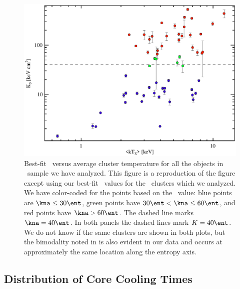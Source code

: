 \begin{figure}[htp]
  \begin{center}
    \begin{minipage}[htp]{\linewidth}
      \includegraphics*[width=\textwidth, trim=0mm 0mm 0mm 0mm, clip]{hifl_txk0}
      \caption[Best-fit \kna\ versus average cluster temperature for
        the \hifl\ sample.]{Best-fit \kna\ versus average cluster
        temperature for all the objects in \hifl\ sample we have
        analyzed. This figure is a reproduction of the
        \cite{2007hvcg.conf...42H} figure except using our best-fit
        \kna\ values for the \hifl\ clusters which we analyzed. We
        have color-coded for the points based on the \kna\ value: blue
        points are $\kna \le 30 \ent$, green points have $30 \ent <
        \kna \le 60 \ent$, and red points have $\kna > 60 \ent$. The
        dashed line marks $\kna = 40 \ent$. In both panels the dashed
        lines mark $K = 40 \ent$. We do not know if the same clusters
        are shown in both plots, but the bimodality noted in
        \cite{2007hvcg.conf...42H} is also evident in our data and
        occurs at approximately the same location along the entropy
        axis.}
    \label{fig:hifltx}
    \end{minipage}
  \end{center}
\end{figure}

\subsection{Distribution of Core Cooling Times}
\label{sec:entsupphifl}

